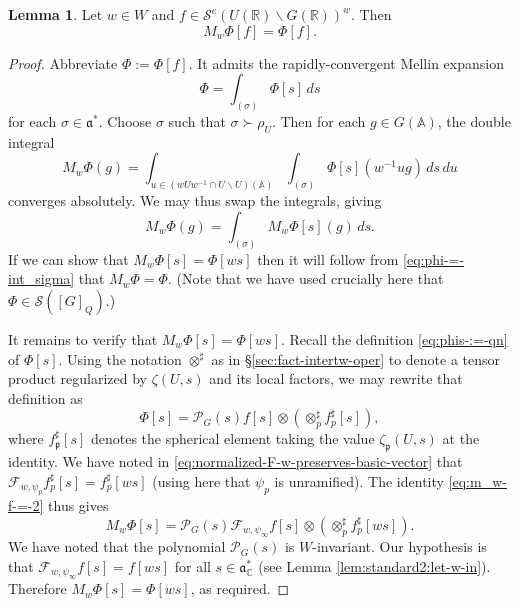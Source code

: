 \documentclass[reqno]{amsart}
\theoremstyle{plain} \newtheorem{theorem} {Theorem}
\theoremstyle{definition} \newtheorem{definition} [theorem] {Definition}
\theoremstyle{itplain} %
\newtheorem{lemma}[theorem]{Lemma}
\numberwithin{equation}{section}
\numberwithin{theorem}{section}
\begin{document}
\begin{lemma}\label{lem:standard2:let-f_infty-in}
  Let $w \in W$ and $f \in \mathcal{S}^e(U(\mathbb{R}) \backslash G(\mathbb{R}))^w$.  Then
  \begin{equation*}
    M_w \Phi[f] =
    \Phi[f].
  \end{equation*}
\end{lemma}
\begin{proof}
  Abbreviate $\Phi := \Phi[f]$.  It admits the rapidly-convergent Mellin expansion
  \begin{equation}\label{eq:phi-=-int_sigma}
    \Phi = \int_{(\sigma)} \Phi[s] \, d s
  \end{equation}
  for each $\sigma \in \mathfrak{a}^*$.  Choose $\sigma$ such that $\sigma \succ \rho_{U}$.  Then for each $g \in G(\mathbb{A})$, the double integral
  \begin{equation*}
    M_w \Phi(g) = \int _{u \in
      (w U w^{-1} \cap U \backslash  U)(\mathbb{A})} \int _{(\sigma)}  \Phi[s](w^{-1} u g) \, d s \, d u
  \end{equation*}
  converges absolutely.  We may thus swap the integrals, giving
  \begin{equation*}
    M_w \Phi(g) = \int _{(\sigma) } M_w \Phi[s](g) \, d s.
  \end{equation*}
  If we can show that $M_w \Phi[s] = \Phi[w s]$ then it will follow from \eqref{eq:phi-=-int_sigma} that $M_w \Phi = \Phi$.  (Note that we have used crucially here that $\Phi \in \mathcal{S}([G]_{Q})$.)

  It remains to verify that $M_w \Phi[s] = \Phi[w s]$.  Recall the definition \eqref{eq:phis-:=-qn} of $\Phi[s]$.  Using the notation $\otimes ^\sharp$ as in \S\ref{sec:fact-intertw-oper} to denote a tensor product regularized by $\zeta(U,s)$ and its local factors, we may rewrite that definition as
  \begin{equation*}
    \Phi[s] = \mathcal{P}_G(s) f[s] \otimes (\otimes_{p} ^\sharp f_p ^\sharp [s]),
  \end{equation*}
  where $f_\mathfrak{p} ^\sharp [s]$ denotes the spherical element taking the value $\zeta_\mathfrak{p}(U,s)$ at the identity.  We have noted in \eqref{eq:normalized-F-w-preserves-basic-vector} that $\mathcal{F}_{w,\psi_p} f_p ^\sharp[s] = f_p ^\sharp [w s]$ (using here that $\psi_p$ is unramified).  The identity \eqref{eq:m_w-f-=-2} thus gives
  \begin{equation*}
    M_w \Phi[s] = \mathcal{P}_G(s) \mathcal{F}_{w,\psi_\infty} f[s] \otimes (\otimes_p ^\sharp f_p ^\sharp [w s]).
  \end{equation*}
  We have noted that the polynomial $\mathcal{P}_G(s)$ is $W$-invariant.  Our hypothesis is that $\mathcal{F}_{w,\psi_\infty} f[s] = f[ w s]$ for all $s \in \mathfrak{a}_{\mathbb{C}}^*$ (see Lemma \ref{lem:standard2:let-w-in}).  Therefore $M_w \Phi[s] = \Phi[w s]$, as required.
\end{proof}
\end{document}
